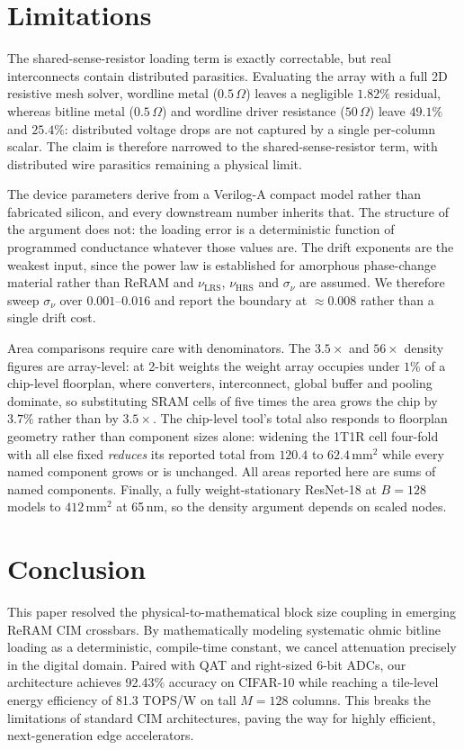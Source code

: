\documentclass[conference]{IEEEtran}
\begin{document}
\section{Limitations}
\label{sec:limits}
The shared-sense-resistor loading term is exactly correctable, but real interconnects contain distributed parasitics. Evaluating the array with a full 2D resistive mesh solver, wordline metal ($0.5\,\Omega$) leaves a negligible $1.82\%$ residual, whereas bitline metal ($0.5\,\Omega$) and wordline driver resistance ($50\,\Omega$) leave $49.1\%$ and $25.4\%$: distributed voltage drops are not captured by a single per-column scalar. The claim is therefore narrowed to the shared-sense-resistor term, with distributed wire parasitics remaining a physical limit.

The device parameters derive from a Verilog-A compact model rather than fabricated silicon, and every downstream number inherits that. The structure of the argument does not: the loading error is a deterministic function of programmed conductance whatever those values are. The drift exponents are the weakest input, since the power law is established for amorphous phase-change material rather than ReRAM and $\nu_{\text{LRS}}$, $\nu_{\text{HRS}}$ and $\sigma_\nu$ are assumed. We therefore sweep $\sigma_\nu$ over $0.001$--$0.016$ and report the boundary at $\approx\!0.008$ rather than a single drift cost.

Area comparisons require care with denominators. The $3.5\times$ and $56\times$ density figures are array-level: at 2-bit weights the weight array occupies under $1\%$ of a chip-level floorplan, where converters, interconnect, global buffer and pooling dominate, so substituting SRAM cells of five times the area grows the chip by $3.7\%$ rather than by $3.5\times$. The chip-level tool's total also responds to floorplan geometry rather than component sizes alone: widening the 1T1R cell four-fold with all else fixed \emph{reduces} its reported total from $120.4$ to $62.4\,\text{mm}^2$ while every named component grows or is unchanged. All areas reported here are sums of named components. Finally, a fully weight-stationary ResNet-18 at $B{=}128$ models to $412\,\text{mm}^2$ at 65\,nm, so the density argument depends on scaled nodes.

\section{Conclusion}
This paper resolved the physical-to-mathematical block size coupling in emerging ReRAM CIM crossbars. By mathematically modeling systematic ohmic bitline loading as a deterministic, compile-time constant, we cancel attenuation precisely in the digital domain. Paired with QAT and right-sized 6-bit ADCs, our architecture achieves 92.43\% accuracy on CIFAR-10 while reaching a tile-level energy efficiency of 81.3 TOPS/W on tall $M=128$ columns. This breaks the limitations of standard CIM architectures, paving the way for highly efficient, next-generation edge accelerators.
\end{document}
